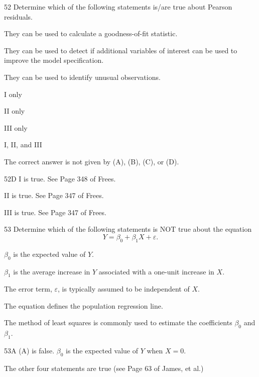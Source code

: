 \begin{question}{52}
Determine which of the following statements is/are true about Pearson residuals.

\begin{statements}
\item They can be used to calculate a goodness-of-fit statistic.
\item They can be used to detect if additional variables of interest can be used to improve the model specification.
\item They can be used to identify unusual observations.
\end{statements}

\begin{choices}
\item I only
\item II only
\item III only
\item I, II, and III
\item The correct answer is not given by (A), (B), (C), or (D).
\end{choices}
\end{question}
\begin{solution}{52}{D}
I is true. See Page 348 of Frees.

II is true. See Page 347 of Frees.

III is true. See Page 347 of Frees.
\end{solution}

\begin{question}{53}
Determine which of the following statements is NOT true about the equation
\[ Y = \beta_0 + \beta_1 X + \varepsilon. \]

\begin{choices}
\item $\beta_0$ is the expected value of $Y$.
\item $\beta_1$ is the average increase in $Y$ associated with a one-unit increase in $X$.
\item The error term, $\varepsilon$, is typically assumed to be independent of $X$.
\item The equation defines the population regression line.
\item The method of least squares is commonly used to estimate the coefficients $\beta_0$ and $\beta_1$.
\end{choices}
\end{question}
\begin{solution}{53}{A}
(A) is false. $\beta_0$ is the expected value of $Y$ when $X = 0$.

The other four statements are true (see Page 63 of James, et al.)
\end{solution}

